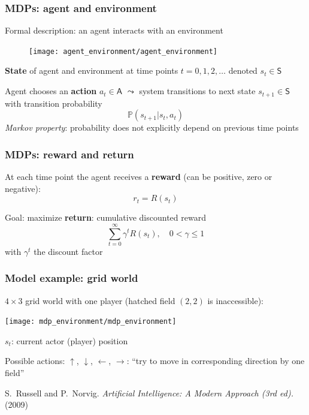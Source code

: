 \documentclass[t]{beamer}
\begin{document}
\begin{frame}
\frametitle{MDPs: agent and environment}
Formal description: an agent interacts with an environment
\begin{figure}
\texttt{[image: agent\_environment/agent\_environment]}
\end{figure}

\textbf{State} of agent and environment at time points $t = 0, 1, 2, \dots$ denoted $s_t \in \mathsf{S}$

Agent chooses an \textbf{action} $a_t \in \mathsf{A}$ $\leadsto$ system transitions to next state $s_{t+1} \in \mathsf{S}$ with transition probability
\[
\mathbb{P}(s_{t+1} \vert s_t, a_t)
\]
\emph{Markov property}: probability does not explicitly depend on previous time points
\end{frame}



\begin{frame}
\frametitle{MDPs: reward and return}
At each time point the agent receives a \textbf{reward} (can be positive, zero or negative):
\[
r_t = R(s_t)
\]

Goal: maximize \textbf{return}: cumulative discounted reward
\[
\sum_{t=0}^\infty \gamma^t R(s_t), \quad 0 < \gamma \le 1
\]
with $\gamma^t$ the discount factor
\end{frame}



\begin{frame}
\frametitle{Model example: grid world}
$4 \times 3$ grid world with one player (hatched field $(2, 2)$ is inaccessible):
\begin{center}
\texttt{[image: mdp\_environment/mdp\_environment]}
\end{center}
\vspace{-0.5cm}
$s_t$: current actor (player) position

Possible actions: $\uparrow$, $\downarrow$, $\leftarrow$, $\rightarrow$: ``try to move in corresponding direction by one field''

\vfill

{\small
S.~Russell and P.~Norvig. \emph{Artificial Intelligence: A Modern Approach (3rd ed).} (2009) \nocite{RussellNorvig}
}
\end{frame}
\end{document}
